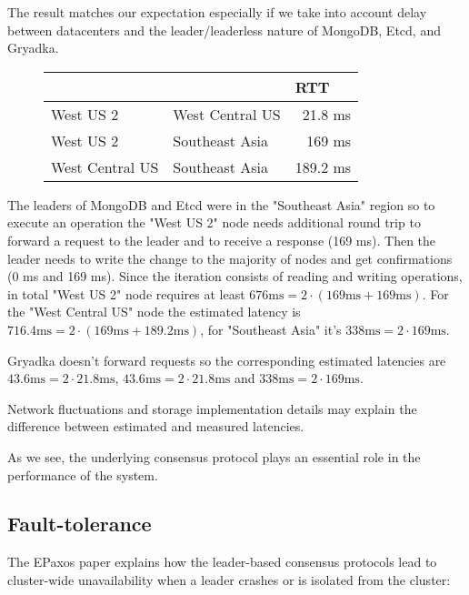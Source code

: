 \documentclass[12pt]{article}
\theoremstyle{definition}
\begin{document}
The result matches our expectation especially if we take into account delay between datacenters and the leader/leaderless nature of MongoDB, Etcd, and Gryadka.

\begin{figure}[!h]
  \centering
  \begin{tabular}{llr|}
  \cline{3-3}
  & & \multicolumn{1}{|l|}{RTT} \\
  \hline
  \multicolumn{1}{|l|}{West US 2} & \multicolumn{1}{|l|}{West Central US} & 21.8 ms\\
  \hline
  \multicolumn{1}{|l|}{West US 2} & \multicolumn{1}{|l|}{Southeast Asia} & 169 ms\\
  \hline
  \multicolumn{1}{|l|}{West Central US} & \multicolumn{1}{|l|}{Southeast Asia} & 189.2 ms\\
  \hline
  \end{tabular}
\end{figure}

The leaders of MongoDB and Etcd were in the "Southeast Asia" region so to execute an operation the "West US 2" node needs additional round trip to forward a request to the leader and to receive a response (169 ms). Then the leader needs to write the change to the majority of nodes and get confirmations (0 ms and 169 ms). Since the iteration consists of reading and writing operations, in total "West US 2" node requires at least $676 \mbox{ms} = 2 \cdot (169 \mbox{ms} + 169 \mbox{ms})$. For the "West Central US" node the estimated latency is $716.4 \mbox{ms} = 2 \cdot (169 \mbox{ms} + 189.2 \mbox{ms})$, for "Southeast Asia" it's $338 \mbox{ms} = 2 \cdot 169 \mbox{ms}$.

Gryadka doesn't forward requests so the corresponding estimated latencies are $43.6 \mbox{ms} = 2 \cdot 21.8 \mbox{ms}$, $43.6 \mbox{ms} = 2 \cdot 21.8 \mbox{ms}$ and $338 \mbox{ms} = 2 \cdot 169 \mbox{ms}$.

Network fluctuations and storage implementation details may explain the difference between estimated and measured latencies.

As we see, the underlying consensus protocol plays an essential role in the performance of the system.

\subsection{Fault-tolerance}

The EPaxos paper explains how the leader-based consensus protocols lead to cluster-wide unavailability when a leader crashes or is isolated from the cluster:
\end{document}
